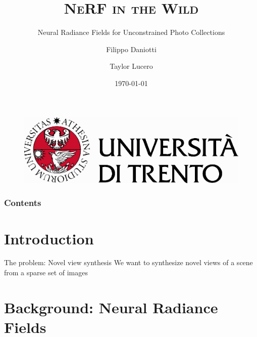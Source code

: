 \documentclass[aspectratio=1610]{beamer}
\author[Daniotti \and Lucero]{Filippo Daniotti \and Taylor Lucero}
\title[NeRF-W]{\textsc{NeRF in the Wild}}
\subtitle{Neural Radiance Fields for Unconstrained Photo Collections}
\institute[DISI - UniTN]{Department of Information Engineering\\and Computer Science}
\date{\today}
\begin{document}
\begin{frame}
    \titlepage
    \begin{figure}[H]
        \begin{center}
            \includegraphics[width=0.4\linewidth]{marchio_unitrento_colore_it_202002.eps}
        \end{center}
    \end{figure}
\end{frame}


\begin{frame}
    \frametitle{Contents}
    \tableofcontents[sectionstyle=show,subsectionstyle=show,subsubsectionstyle=show/shaded/hide]
\end{frame}

\section{Introduction}
\begin{frame}{The problem: Novel view synthesis}
    We want to synthesize novel views of a scene from a sparse set of images  
    \begin{figure}[H]
    \end{figure}
\end{frame}


\section{Background: Neural Radiance Fields}
\end{document}
